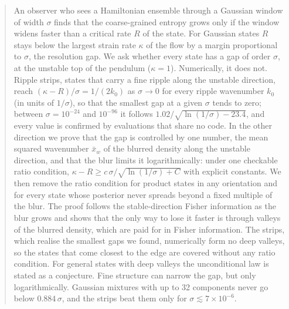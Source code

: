 \begin{abstract}
An observer who sees a Hamiltonian ensemble through a Gaussian window of width $\sigma$ finds that the coarse-grained entropy grows only if the window widens faster than a critical rate $R$ of the state. For Gaussian states $R$ stays below the largest strain rate $\kappa$ of the flow by a margin proportional to $\sigma$, the resolution gap. We ask whether every state has a gap of order $\sigma$, at the unstable top of the pendulum ($\kappa = 1$). Numerically, it does not. Ripple strips, states that carry a fine ripple along the unstable direction, reach $(\kappa - R)/\sigma = 1/(2k_0)$ as $\sigma \to 0$ for every ripple wavenumber $k_0$ (in units of $1/\sigma$), so that the smallest gap at a given $\sigma$ tends to zero; between $\sigma = 10^{-24}$ and $10^{-96}$ it follows $1.02/\sqrt{\ln(1/\sigma) - 23.4}$, and every value is confirmed by evaluations that share no code. In the other direction we prove that the gap is controlled by one number, the mean squared wavenumber $\bar x_w$ of the blurred density along the unstable direction, and that the blur limits it logarithmically: under one checkable ratio condition, $\kappa - R \geq c\,\sigma/\sqrt{\ln(1/\sigma) + C}$ with explicit constants. We then remove the ratio condition for product states in any orientation and for every state whose posterior never spreads beyond a fixed multiple of the blur. The proof follows the stable-direction Fisher information as the blur grows and shows that the only way to lose it faster is through valleys of the blurred density, which are paid for in Fisher information. The strips, which realise the smallest gaps we found, numerically form no deep valleys, so the states that come closest to the edge are covered without any ratio condition. For general states with deep valleys the unconditional law is stated as a conjecture. Fine structure can narrow the gap, but only logarithmically. Gaussian mixtures with up to 32 components never go below $0.884\,\sigma$, and the strips beat them only for $\sigma \lesssim 7\times 10^{-6}$.
\end{abstract}

